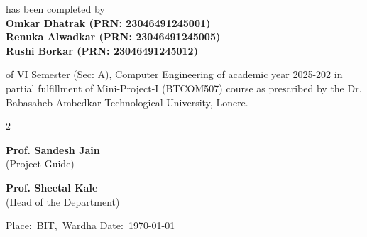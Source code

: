 \documentclass[a4paper, 12pt]{report}
\begin{document}
\begin{titlepage}
\begin{center}
	has been completed by \\[0.8cm]
	\textbf{Omkar Dhatrak (PRN: 23046491245001)}\\[0.25cm]
	\textbf{Renuka Alwadkar (PRN: 23046491245005)}\\[0.25cm]
	\textbf{Rushi Borkar (PRN: 23046491245012)}\\[0.5cm]
\end{center}
of VI Semester (Sec: A), Computer Engineering of academic year 2025-202 in partial fulfillment of Mini-Project-I (BTCOM507) course as prescribed by the Dr. Babasaheb Ambedkar Technological University, Lonere.
\vspace{2cm}
\begin{multicols}{2}
\begin{center}
\textbf{Prof. Sandesh Jain}\\
(Project Guide)\\
\end{center}
\begin{center}
\textbf{Prof. Sheetal Kale}\\
(Head of the Department)\\
\end{center}
\end{multicols}
\vspace{1.5cm}
\hbox {Place: BIT, Wardha\\}
\hbox {Date: \today\\}
\end{titlepage}
\end{document}
